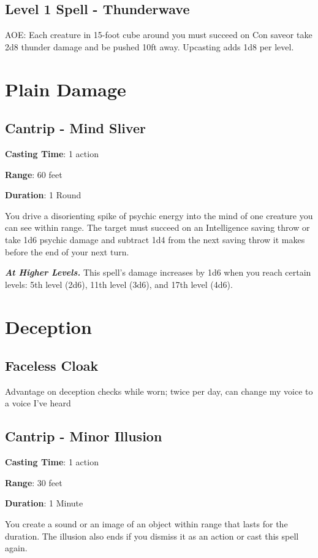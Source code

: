 \documentclass{article}
\begin{document}
\subsection{Level 1 Spell - Thunderwave}
AOE: Each creature in 15-foot cube around you must succeed on Con saveor take 2d8 thunder damage and be pushed 10ft away. Upcasting adds 1d8 per level.

\clearpage
\setcounter{section}{0}
\section{Plain Damage}
\subsection{Cantrip - Mind Sliver}
\noindent\textbf{Casting Time}: 1 action

\noindent\textbf{Range}: 60 feet

\noindent\textbf{Duration}: 1 Round

You drive a disorienting spike of psychic energy into the mind of one creature you can see within range. The target must succeed on an Intelligence saving throw or take 1d6 psychic damage and subtract 1d4 from the next saving throw it makes before the end of your next turn.

\textbf{\textit{At Higher Levels.}} This spell’s damage increases by 1d6 when you reach certain levels: 5th level (2d6), 11th level (3d6), and 17th level (4d6).

\section{Deception}
\subsection{Faceless Cloak}
Advantage on deception checks while worn; twice per day, can change my voice to a voice I've heard

\subsection{Cantrip - Minor Illusion}
\noindent\textbf{Casting Time}: 1 action

\noindent\textbf{Range}: 30 feet

\noindent\textbf{Duration}: 1 Minute

You create a sound or an image of an object within range that lasts for the duration. The illusion also ends if you dismiss it as an action or cast this spell again.
\end{document}
